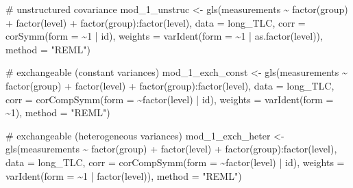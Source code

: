 \documentclass[
  letterpaper,
  DIV=11,
  numbers=noendperiod]{scrreprt}
\newenvironment{Shaded}{\begin{snugshade}}{\end{snugshade}}
\newcommand{\AttributeTok}[1]{\textcolor[rgb]{0.40,0.45,0.13}{#1}}
\newcommand{\CommentTok}[1]{\textcolor[rgb]{0.37,0.37,0.37}{#1}}
\newcommand{\DecValTok}[1]{\textcolor[rgb]{0.68,0.00,0.00}{#1}}
\newcommand{\FunctionTok}[1]{\textcolor[rgb]{0.28,0.35,0.67}{#1}}
\newcommand{\NormalTok}[1]{\textcolor[rgb]{0.00,0.23,0.31}{#1}}
\newcommand{\OtherTok}[1]{\textcolor[rgb]{0.00,0.23,0.31}{#1}}
\newcommand{\SpecialCharTok}[1]{\textcolor[rgb]{0.37,0.37,0.37}{#1}}
\newcommand{\StringTok}[1]{\textcolor[rgb]{0.13,0.47,0.30}{#1}}
\begin{document}
\begin{Shaded}
\begin{Highlighting}[]
\CommentTok{\# unstructured covariance}
\NormalTok{mod\_1\_unstruc }\OtherTok{\textless{}{-}} \FunctionTok{gls}\NormalTok{(measurements }\SpecialCharTok{\textasciitilde{}} \FunctionTok{factor}\NormalTok{(group) }\SpecialCharTok{+} \FunctionTok{factor}\NormalTok{(level) }\SpecialCharTok{+} \FunctionTok{factor}\NormalTok{(group)}\SpecialCharTok{:}\FunctionTok{factor}\NormalTok{(level),}
    \AttributeTok{data =}\NormalTok{ long\_TLC, }\AttributeTok{corr =} \FunctionTok{corSymm}\NormalTok{(}\AttributeTok{form =} \SpecialCharTok{\textasciitilde{}}\DecValTok{1} \SpecialCharTok{|}\NormalTok{ id), }\AttributeTok{weights =} \FunctionTok{varIdent}\NormalTok{(}\AttributeTok{form =} \SpecialCharTok{\textasciitilde{}}\DecValTok{1} \SpecialCharTok{|}
        \FunctionTok{as.factor}\NormalTok{(level)), }\AttributeTok{method =} \StringTok{"REML"}\NormalTok{)}

\CommentTok{\# exchangeable (constant variances)}
\NormalTok{mod\_1\_exch\_const }\OtherTok{\textless{}{-}} \FunctionTok{gls}\NormalTok{(measurements }\SpecialCharTok{\textasciitilde{}} \FunctionTok{factor}\NormalTok{(group) }\SpecialCharTok{+} \FunctionTok{factor}\NormalTok{(level) }\SpecialCharTok{+} \FunctionTok{factor}\NormalTok{(group)}\SpecialCharTok{:}\FunctionTok{factor}\NormalTok{(level),}
    \AttributeTok{data =}\NormalTok{ long\_TLC, }\AttributeTok{corr =} \FunctionTok{corCompSymm}\NormalTok{(}\AttributeTok{form =} \SpecialCharTok{\textasciitilde{}}\FunctionTok{factor}\NormalTok{(level) }\SpecialCharTok{|}\NormalTok{ id), }\AttributeTok{weights =} \FunctionTok{varIdent}\NormalTok{(}\AttributeTok{form =} \SpecialCharTok{\textasciitilde{}}\DecValTok{1}\NormalTok{),}
    \AttributeTok{method =} \StringTok{"REML"}\NormalTok{)}

\CommentTok{\# exchangeable (heterogeneous variances)}
\NormalTok{mod\_1\_exch\_heter }\OtherTok{\textless{}{-}} \FunctionTok{gls}\NormalTok{(measurements }\SpecialCharTok{\textasciitilde{}} \FunctionTok{factor}\NormalTok{(group) }\SpecialCharTok{+} \FunctionTok{factor}\NormalTok{(level) }\SpecialCharTok{+} \FunctionTok{factor}\NormalTok{(group)}\SpecialCharTok{:}\FunctionTok{factor}\NormalTok{(level),}
    \AttributeTok{data =}\NormalTok{ long\_TLC, }\AttributeTok{corr =} \FunctionTok{corCompSymm}\NormalTok{(}\AttributeTok{form =} \SpecialCharTok{\textasciitilde{}}\FunctionTok{factor}\NormalTok{(level) }\SpecialCharTok{|}\NormalTok{ id), }\AttributeTok{weights =} \FunctionTok{varIdent}\NormalTok{(}\AttributeTok{form =} \SpecialCharTok{\textasciitilde{}}\DecValTok{1} \SpecialCharTok{|}
        \FunctionTok{factor}\NormalTok{(level)), }\AttributeTok{method =} \StringTok{"REML"}\NormalTok{)}
\end{Highlighting}
\end{Shaded}
\end{document}
